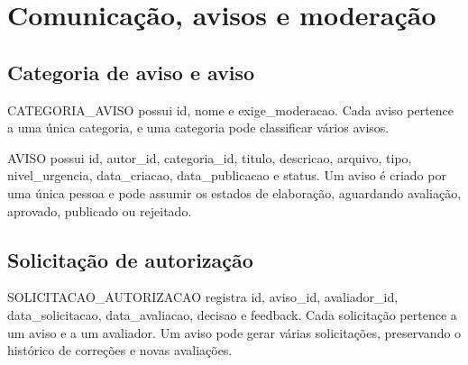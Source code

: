 \section{Comunicação, avisos e moderação}
\subsection{Categoria de aviso e aviso}
CATEGORIA\_AVISO possui id, nome e exige\_moderacao. Cada aviso pertence a uma única categoria, e uma categoria pode classificar vários avisos.

AVISO possui id, autor\_id, categoria\_id, titulo, descricao, arquivo, tipo, nivel\_urgencia, data\_criacao, data\_publicacao e status. Um aviso é criado por uma única pessoa e pode assumir os estados de elaboração, aguardando avaliação, aprovado, publicado ou rejeitado.

\subsection{Solicitação de autorização}
SOLICITACAO\_AUTORIZACAO registra id, aviso\_id, avaliador\_id, data\_solicitacao, data\_avaliacao, decisao e feedback. Cada solicitação pertence a um aviso e a um avaliador. Um aviso pode gerar várias solicitações, preservando o histórico de correções e novas avaliações.

